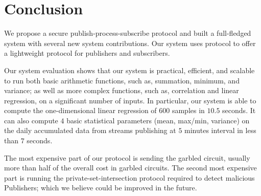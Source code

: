 \section{Conclusion}
\label{sec:conclusion}

We propose a secure publish-process-subscribe protocol and built a full-fledged
system with several new system contributions. Our system uses \MQTT protocol to
offer a lightweight protocol for publishers and subscribers.

Our system evaluation shows that our system is practical, efficient, and
scalable to run both basic arithmetic functions, such as, summation, minimum,
and variance; as well as more complex functions, such as, correlation and
linear regression, on a significant number of inputs. In particular, our system
is able to compute the one-dimensional linear regression of $600$ samples in
$10.5$ seconds. It can also compute $4$ basic statistical parameters (mean,
max/min, variance) on the daily accumulated data from streams publishing at $5$
minutes interval in less than $7$ seconds.

The most expensive part of our protocol is sending the garbled circuit, usually
more than half of the overall cost in garbled circuits.  The second most
expensive part is running the private-set-intersection protocol required to
detect malicious Publishers; which we believe could be improved in the future.

